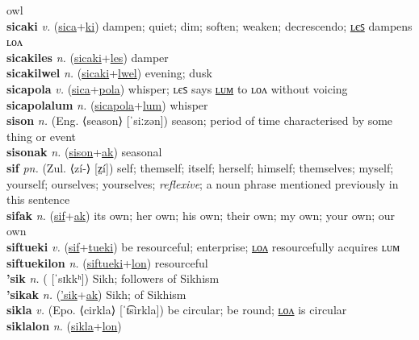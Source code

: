 owl \label{sicalwelkiah} \\
\textbf{sicaki} \textit{v.} (\hyperref[sica]{sica}+\hyperref[ki]{ki})
dampen; quiet; dim; soften; weaken; decrescendo; \hyperref[sicakiles]{ʟєꜱ} dampens ʟᴏᴧ \label{sicaki} \\
\textbf{sicakiles} \textit{n.} (\hyperref[sicaki]{sicaki}+\hyperref[les]{les})
damper \label{sicakiles} \\
\textbf{sicakilwel} \textit{n.} (\hyperref[sicaki]{sicaki}+\hyperref[lwel]{lwel})
evening; dusk \label{sicakilwel} \\
\textbf{sicapola} \textit{v.} (\hyperref[sica]{sica}+\hyperref[pola]{pola})
whisper; ʟєꜱ says \hyperref[sicapolalum]{ʟᴜᴍ} to ʟᴏᴧ without voicing \label{sicapola} \\
\textbf{sicapolalum} \textit{n.} (\hyperref[sicapola]{sicapola}+\hyperref[lum]{lum})
whisper \label{sicapolalum} \\
\textbf{sison} \textit{n.} (Eng. ⟨season⟩ [ˈsiːzən])
season; period of time characterised by some thing or event \label{sison} \\
\textbf{sisonak} \textit{n.} (\hyperref[sison]{sison}+\hyperref[ak]{ak})
seasonal \label{sisonak} \\
\textbf{sif} \textit{pn.} (Zul. ⟨zí-⟩ [z̤í])
self; themself; itself; herself; himself; themselves; myself; yourself; ourselves; yourselves; \textit{reflexive}; a noun phrase mentioned previously in this sentence \label{sif} \\
\textbf{sifak} \textit{n.} (\hyperref[sif]{sif}+\hyperref[ak]{ak})
its own; her own; his own; their own; my own; your own; our own \label{sifak} \\
\textbf{siftueki} \textit{v.} (\hyperref[sif]{sif}+\hyperref[tueki]{tueki})
be resourceful; enterprise; \hyperref[siftuekilon]{ʟᴏᴧ} resourcefully acquires ʟᴜᴍ \label{siftueki} \\
\textbf{siftuekilon} \textit{n.} (\hyperref[siftueki]{siftueki}+\hyperref[lon]{lon})
resourceful \label{siftuekilon} \\
\textbf{'sik} \textit{n.} ( [ˈsɪkkʰ])
Sikh; followers of Sikhism \label{'sik} \\
\textbf{'sikak} \textit{n.} (\hyperref['sik]{'sik}+\hyperref[ak]{ak})
Sikh; of Sikhism \label{'sikak} \\
\textbf{sikla} \textit{v.} (Epo. ⟨cirkla⟩ [ˈt͡sirkla])
be circular; be round; \hyperref[siklalon]{ʟᴏᴧ} is circular \label{sikla} \\
\textbf{siklalon} \textit{n.} (\hyperref[sikla]{sikla}+\hyperref[lon]{lon})
